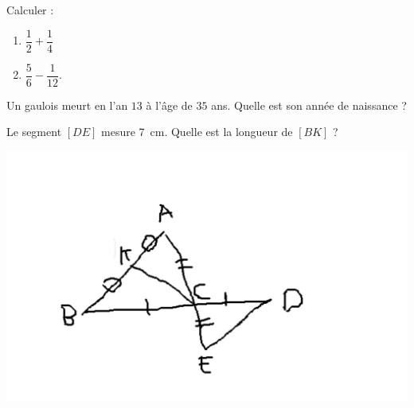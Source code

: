 \begin{MentalActivity}
    \begin{mental}
        Calculer :
        \begin{enumerate}
            \item
                \( \dfrac{ 1 }{ 2 }+\dfrac{ 1 }{ 4 }\)
            \item
                \( \dfrac{ 5 }{ 6 }-\dfrac{ 1 }{ 12 }\).
        \end{enumerate}
    \end{mental}
    \begin{mental}
        Un gaulois meurt en l'an \( 13\) à l'âge de \( 35\) ans. Quelle est son année de naissance ?
    \end{mental}
    \begin{mental}
        Le segment \( [DE]\) mesure \SI{7}{\centi\meter}. Quelle est la longueur de \( [BK]\) ?
        \begin{center}
            \includegraphics[width=20cm]{triangle_mental.pdf}
        \end{center}
    \end{mental}
\end{MentalActivity}

